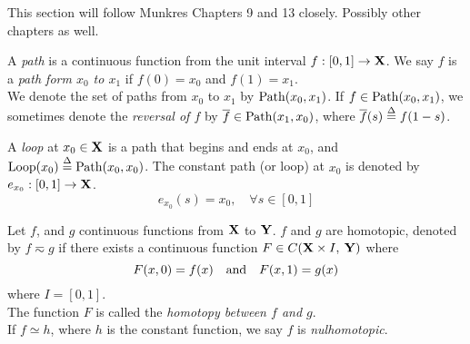 \documentclass[../main-manifolds.tex]{subfiles}
\providecommand{\htp}{\simeq}    %
\begin{document}
\newpage


This section will follow Munkres Chapters 9 and 13 closely. Possibly other chapters as well.

\begin{definition}[Path]\label{munkres:path}
    A \emph{path} is a continuous function from the unit interval $f:[0,1]\to {\mathbf{X}}$. We say $f$ is a \emph{path form $x_0$ to $x_1$} if $f(0)=x_0$ and $f(1)=x_1$.\\

    We denote the set of paths from $x_0$ to $x_1$ by $\Path[x_0, x_1]$. If $f\in\Path[x_0,x_1]$, we sometimes denote the \emph{reversal of $f$} by $\cl{f}\in\Path[x_1,x_0]$, where $\overline{f}(s)\overset{\Delta}{=} f(1-s)$.
\end{definition}

\begin{definition}[Loop]\label{munkres:loop}
    A \emph{loop} at $x_0\in{\mathbf{X}}$ is a path that begins and ends at $x_0$, and $\Loop[x_0]\defined\Path[x_0,x_0]$. The constant path (or loop) at $x_0$ is denoted by $e_{x_0}: [0,1]\to {\mathbf{X}}$. 
    \[
        e_{x_0}(s)=x_0,\quad \forall s\in[0,1]
    \]
\end{definition}
\begin{definition}[Homotopy of $C(\xx,\:\yy)$]\label{munkres:homotopy-of-functions}
    Let $f$, and $g$ continuous functions from ${\mathbf{X}}$ to ${\mathbf{Y}}$. $f$ and $g$ are homotopic, denoted by $f\eqsim g$ if there exists a continuous function $F\in C({\mathbf{X}}\times I,\: {\mathbf{Y}})$ where
    \begin{equation}\label{munkres:homotopy-functions-equation}
        F(x,0)=f(x)\qqtext{and} F(x,1) = g(x)
    \end{equation}
    where $I = [0,1]$.\\

    The function $F$ is called the \emph{homotopy between $f$ and $g$}.\\

    If $f\htp h$, where $h$ is the constant function, we say $f$ is \emph{nulhomotopic}.
\end{definition}
\end{document}
